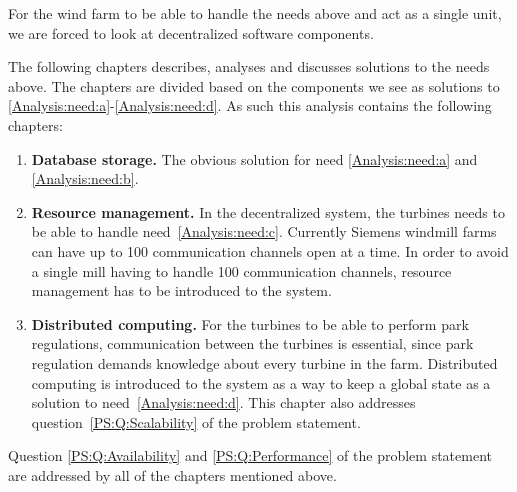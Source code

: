 For the wind farm to be able to handle the needs above and act as a single unit, we are forced to look at decentralized software components. 

The following chapters describes, analyses and discusses solutions to the needs above. The chapters are divided based on the components we see as solutions to \ref{Analysis:need:a}-\ref{Analysis:need:d}. As such this analysis contains the following chapters:

\begin{enumerate}[label=3.\arabic*]
\item{\textbf{Database storage.}} The obvious solution for need \ref{Analysis:need:a} and \ref{Analysis:need:b}.
\item{\textbf{Resource management.}} In the decentralized system, the turbines needs to be able to handle need~\ref{Analysis:need:c}. Currently Siemens windmill farms can have up to 100 communication channels open at a time. In order to avoid a single mill having to handle 100 communication channels, resource management has to be introduced to the system.
\item{\textbf{Distributed computing.}} For the turbines to be able to perform park regulations, communication between the turbines is essential, since park regulation demands knowledge about every turbine in the farm. Distributed computing is introduced to the system as a way to keep a global state as a solution to need~\ref{Analysis:need:d}. This chapter also addresses question~\ref{PS:Q:Scalability} of the problem statement.
\end{enumerate}

Question \ref{PS:Q:Availability} and \ref{PS:Q:Performance} of the problem statement are addressed by all of the chapters mentioned above.

%
%
%
%
%
%




